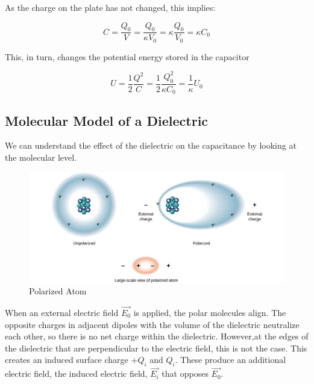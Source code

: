 \documentclass[14pt]{memoir}
\begin{document}
As the charge on the plate has not changed, this implies:

\begin{equation}
C = \frac{Q_0}{V} = \frac{Q_0}{\kappa V_0} = \kappa \frac{Q_0}{V_0} = \kappa C_0
\end{equation}

This, in turn, changes the potential energy stored in the capacitor

\begin{equation}
U = \frac{1}{2} \frac{Q^2}{C} = \frac{1}{2} \frac{Q_0^2}{\kappa C_0} = \frac{1}{\kappa} U_0
\end{equation}

\subsection{Molecular Model of a Dielectric}

We can understand the effect of the dielectric on the capacitance by looking at the molecular level.

\begin{figure}[H]
\begin{center}
\includegraphics[scale=0.50]{fig/fig_08_19.jpg}
\caption{Polarized Atom}
\label{fig:08_19}
\end{center}
\end{figure}

When an external electric field $\vec{E_0}$ is applied, the polar molecules align. The opposite charges in adjacent dipoles with the volume of the dielectric neutralize each other, so there is no net charge within the dielectric. However,at the edges of the dielectric that are perpendicular to the electric field, this is not the case. This creates an induced surface charge $+Q_i$ and $Q_i$. These produce an additional electric field, the induced electric field, $\vec{E_i}$ that opposes $\vec{E_0}$.
\end{document}

